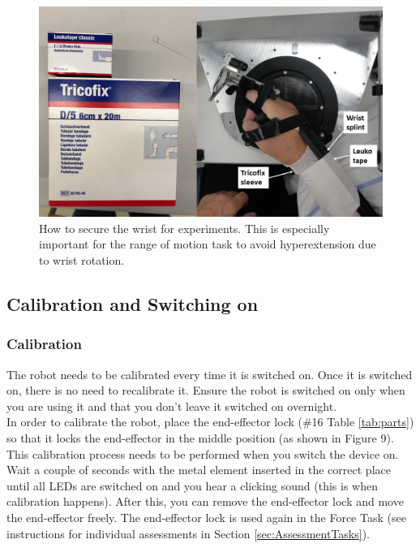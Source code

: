 \documentclass[10pt,oneside,a4paper]{article}
\begin{document}
\begin{figure}[h!]
\begin{center}
\includegraphics[width=\columnwidth]{images/Hardware/WristSplint.png}
\caption{How to secure the wrist for experiments. This is especially important for the range of motion task to avoid hyperextension due to wrist rotation.}
\label{fig:WristSplint}
\end{center}
\end{figure}

\subsection{Calibration and Switching on}
\subsubsection*{Calibration}
The robot needs to be calibrated every time it is switched on. Once it is switched on, there is no need to recalibrate it. Ensure the robot is switched on only when you are using it and that you don’t leave it switched on overnight. \\

In order to calibrate the robot, place the end-effector lock (\#16 Table \ref{tab:parts}) so that it locks the end-effector in the middle position (as shown in Figure 9). \\

This calibration process needs to be performed when you switch the device on. Wait a couple of seconds with the metal element inserted in the correct place until all LEDs are switched on and you hear a clicking sound (this is when calibration happens). After this, you can remove the end-effector lock and move the end-effector freely. The end-effector lock is used again in the Force Task (see instructions for individual assessments in Section \ref{sec:AssessmentTasks}). \\
\end{document}
